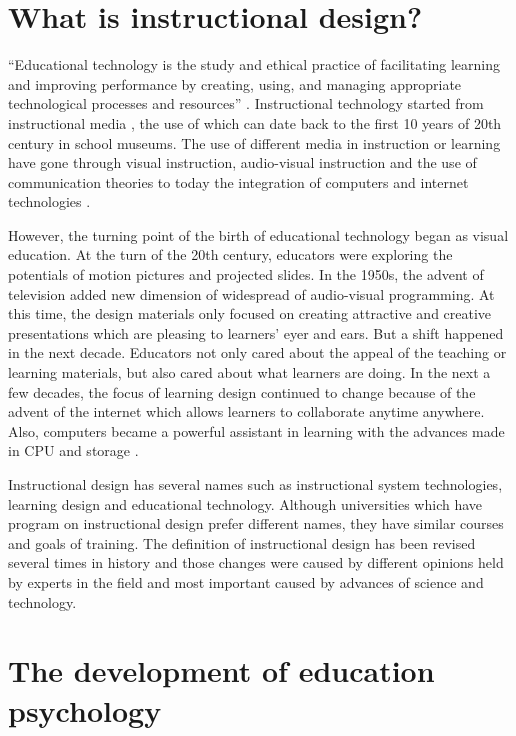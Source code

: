 \documentclass[sigconf]{acmart}
\begin{document}
\section{What is instructional design?}

``Educational technology is the study and ethical practice of facilitating learning and improving performance by creating, using, and managing appropriate technological processes and resources'' \cite{Januszewski2008}.  Instructional technology started from instructional media , the use of which can date back to the first 10 years of 20th century in school museums. The use of different media in instruction or learning have gone through visual instruction, audio-visual instruction and the use of communication theories to today the integration of computers and internet technologies \cite{Reiser2012}.

However, the turning point of the birth of educational technology began as visual education. At the turn of the 20th century, educators were exploring the potentials of motion pictures and projected slides. In the 1950s, the advent of television added new dimension of widespread of audio-visual programming. At this time, the design materials only focused on creating attractive and creative presentations which are pleasing to learners' eyer and ears. But a shift happened in the next decade. Educators not only cared about the appeal of the teaching or learning materials, but also cared about what learners are doing. In the next a few decades, the focus of learning design continued to change because of the advent of the internet which allows learners to collaborate anytime anywhere. Also, computers became a powerful assistant in learning with the advances made in CPU and storage \cite{Molenda2008}.

Instructional design has several names such as instructional system technologies, learning design and educational technology. Although universities which have program on instructional design prefer different names, they have similar courses and goals of training. The definition of instructional design has been revised several times in history and those changes were caused by different opinions held by experts in the field and most important caused by advances of science and technology.

\section{The development of education psychology}
\end{document}
